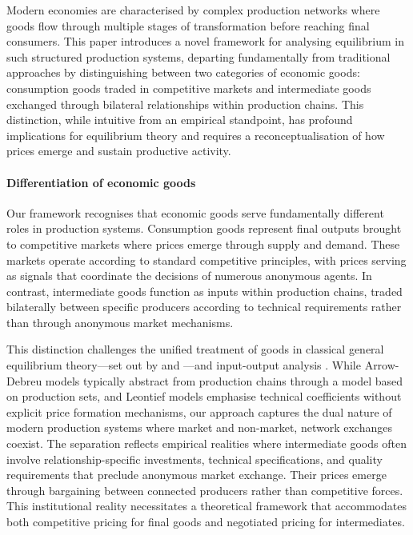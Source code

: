 \documentclass[11pt,fleqn]{article}
\begin{document}
Modern economies are characterised by complex production networks where goods flow through multiple stages of transformation before reaching final consumers. This paper introduces a novel framework for analysing equilibrium in such structured production systems, departing fundamentally from traditional approaches by distinguishing between two categories of economic goods: consumption goods traded in competitive markets and intermediate goods exchanged through bilateral relationships within production chains. This distinction, while intuitive from an empirical standpoint, has profound implications for equilibrium theory and requires a reconceptualisation of how prices emerge and sustain productive activity.

\paragraph{Differentiation of economic goods}

Our framework recognises that economic goods serve fundamentally different roles in production systems. Consumption goods represent final outputs brought to competitive markets where prices emerge through supply and demand. These markets operate according to standard competitive principles, with prices serving as signals that coordinate the decisions of numerous anonymous agents. In contrast, intermediate goods function as inputs within production chains, traded bilaterally between specific producers according to technical requirements rather than through anonymous market mechanisms.

This distinction challenges the unified treatment of goods in classical general equilibrium theory---set out by \citet{ArrowDebreu1954} and \citet{Debreu1959}---and input-output analysis \citep{Leontief1936,Leontief1941}. While Arrow-Debreu models typically abstract from production chains through a model based on production sets, and Leontief models emphasise technical coefficients without explicit price formation mechanisms, our approach captures the dual nature of modern production systems where market and non-market, network exchanges coexist. The separation reflects empirical realities where intermediate goods often involve relationship-specific investments, technical specifications, and quality requirements that preclude anonymous market exchange. Their prices emerge through bargaining between connected producers rather than competitive forces. This institutional reality necessitates a theoretical framework that accommodates both competitive pricing for final goods and negotiated pricing for intermediates.
\end{document}
